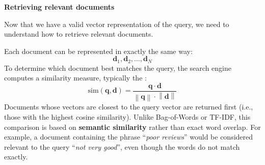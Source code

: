 \highspace
\begin{flushleft}
    \textcolor{Green3}{ \textbf{Retrieving relevant documents}}
\end{flushleft}
Now that we have a valid vector representation of the query, we need to understand how to retrieve relevant documents. 

\highspace
Each document can be represented in exactly the same way:
\begin{equation*}
    \mathbf{d}_{1}, \mathbf{d}_{2}, \ldots, \mathbf{d}_{N}
\end{equation*}
To determine which document best matches the query, the search engine computes a similarity measure, typically the :
\begin{equation*}
    \mathrm{sim}\left(\mathbf{q}, \mathbf{d}\right) = \frac{\mathbf{q} \cdot \mathbf{d}}{\left\|\mathbf{q}\right\| \cdot \left\|\mathbf{d}\right\|}
\end{equation*}
Documents whose vectors are closest to the query vector are returned first (i.e., those with the highest cosine similarity). Unlike Bag-of-Words or TF-IDF, this comparison is based on \textbf{semantic similarity} rather than exact word overlap. For example, a document containing the phrase ``\emph{poor reviews}'' would be considered relevant to the query ``\emph{not very good}'', even though the words do not match exactly.

